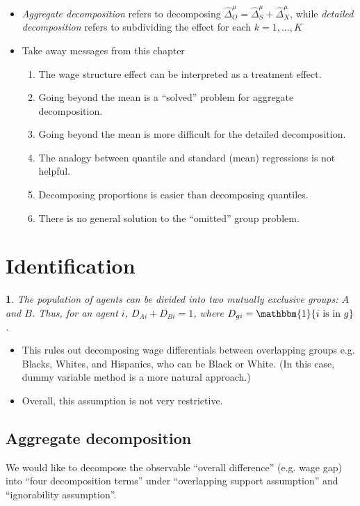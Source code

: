 \documentclass[a4paper, 12pt]{article}
\makeatletter
\newcommand{\ind}{\mathbbm{1}}
\newtheorem*{assumption*}{\assumptionnumber}
\providecommand{\assumptionnumber}{}
\newenvironment{assumption}[2]
 {%
  \renewcommand{\assumptionnumber}{Assumption #1 \textit{(#2)}}%
  \begin{assumption*}%
  \protected@edef\@currentlabel{#1}%
 }
 {%
  \end{assumption*}
 }
\makeatother
\begin{document}
\begin{itemize}
\item \emph{Aggregate decomposition} refers to decomposing $\hat{\Delta}_O^\mu  = \hat{\Delta}_S^\mu + \hat{\Delta}_X^\mu$, while \emph{detailed decomposition} refers to subdividing the effect for each $k=1, ..., K$
\item Take away messages from this chapter
\begin{enumerate}
\item The wage structure effect can be interpreted as a treatment effect.
\item Going beyond the mean is a ``solved'' problem for aggregate decomposition.
\item  Going beyond the mean is more difficult for the detailed decomposition.
\item The analogy between quantile and standard (mean) regressions is not helpful.
\item Decomposing proportions is easier than decomposing quantiles.
\item There is no general solution to the ``omitted'' group problem.
\end{enumerate}
\end{itemize}

\section{Identification}
\begin{assumption}{1}{Mutually Exclusive Groups}
The population of agents can be divided into two mutually exclusive groups: $A$ and $B$. Thus, for an agent $i$, $D_{Ai} + D_{Bi}=1$, where $D_{gi}=\ind \{i\text{ is in }g\}$.
\end{assumption}

\begin{itemize}
\item This rules out decomposing wage differentials between overlapping groups e.g. Blacks, Whites, and Hispanics, who can be Black or White. (In this case, dummy variable method is a more natural approach.)
\item Overall, this assumption is not very restrictive.
\end{itemize}

\subsection{Aggregate decomposition}
We would like to decompose the observable ``overall difference'' (e.g. wage gap) into ``four decomposition terms'' under ``overlapping support assumption'' and ``ignorability assumption''.
\end{document}
